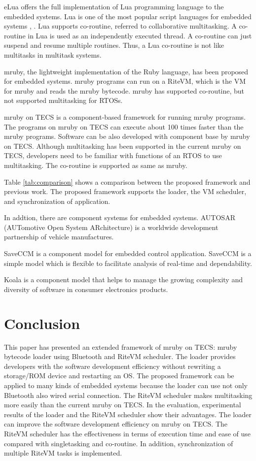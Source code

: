 \documentclass{sig-alternate-05-2015}
\begin{document}
eLua offers the full implementation of Lua programming language to the embedded systems.
Lua is one of the most popular script languages for embedded systems \cite{url:Lua}, \cite{par:Lua}.
Lua supports co-routine, referred to collaborative multitasking.
A co-routine in Lua is used as an independently executed thread.
A co-routine can just suspend and resume multiple routines.
Thus, a Lua co-routine is not like multitasks in multitask systems.

mruby, the lightweight implementation of the Ruby language, has been proposed for embedded systems.
mruby programs can run on a RiteVM, which is the VM for mruby and reads the mruby bytecode.
mruby has supported co-routine, but not supported multitasking for RTOSs.

mruby on TECS is a component-based framework for running mruby programs.
The programs on mruby on TECS can execute about 100 times faster than the mruby programs.
Software can be also developed with component base by mruby on TECS.
Although multitasking has been supported in the current mruby on TECS, developers need to be familiar with functions of an RTOS to use multitasking.
The co-routine is supported as same as mruby.

Table \ref{tab:comparison} shows a comparison between the proposed framework and previous work.
The proposed framework supports the loader, the VM scheduler, and synchronization of application.
 
In addtion, there are component systems for embedded systems.
AUTOSAR (AUTomotive Open System ARchitecture) \cite{} is a worldwide development partnership of vehicle manufactures.

SaveCCM \cite{par:SAVEapproach} is a component model for embedded control application.
SaveCCM is a simple model which is flexible to facilitate analysis of real-time and dependability.

Koala \cite{par:Koala} is a component model that helps to manage the growing complexity and diversity of software in consumer electronics products.


\section{Conclusion}
\label{sec:Conclusion}
This paper has presented an extended framework of mruby on TECS: mruby bytecode loader using Bluetooth and RiteVM scheduler.
The loader provides developers with the software development efficiency without rewriting a storage/ROM device and restarting an OS.
The proposed framework can be applied to many kinds of embedded systems  because the loader can use not only Bluetooth also wired serial connection.
The RiteVM scheduler makes multitasking more easily than the current mruby on TECS.
In the evaluation, experimental results of the loader and the RiteVM scheduler show their advantages.
The loader can improve the software development efficiency on mruby on TECS.
The RiteVM scheduler has the effectiveness in terms of execution time and ease of use compared with singletasking and co-routine.
In addition, synchronization of multiple RiteVM tasks is implemented.
\end{document}
